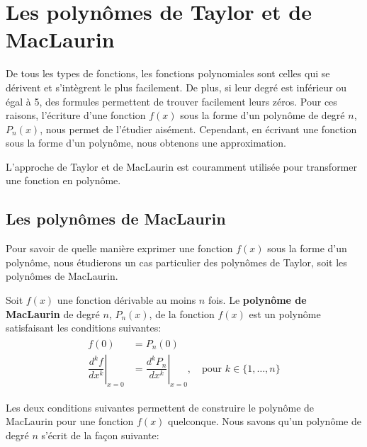 \documentclass[]{book}
\theoremstyle{definition}
\theoremstyle{definition}
\theoremstyle{definition}
\theoremstyle{remark}
\let\BeginKnitrBlock\begin \let\EndKnitrBlock\end
\begin{document}
\hypertarget{les-polynomes-de-taylor-et-de-maclaurin}{%
\section{Les polynômes de Taylor et de
MacLaurin}\label{les-polynomes-de-taylor-et-de-maclaurin}}

De tous les types de fonctions, les fonctions polynomiales sont celles
qui se dérivent et s'intègrent le plus facilement. De plus, si leur
degré est inférieur ou égal à 5, des formules permettent de trouver
facilement leurs zéros. Pour ces raisons, l'écriture d'une fonction
\(f(x)\) sous la forme d'un polynôme de degré \(n\), \(P_n(x)\), nous
permet de l'étudier aisément. Cependant, en écrivant une fonction sous
la forme d'un polynôme, nous obtenons une approximation.

L'approche de Taylor et de MacLaurin est couramment utilisée pour
transformer une fonction en polynôme.

\hypertarget{les-polynomes-de-maclaurin}{%
\subsection{Les polynômes de
MacLaurin}\label{les-polynomes-de-maclaurin}}

Pour savoir de quelle manière exprimer une fonction \(f(x)\) sous la
forme d'un polynôme, nous étudierons un cas particulier des polynômes de
Taylor, soit les polynômes de MacLaurin.

\BeginKnitrBlock{definition}[Polynôme de Maclaurin]
\protect\hypertarget{def:unnamed-chunk-1}{}{\label{def:unnamed-chunk-1}
{} }Soit \(f(x)\) une fonction
dérivable au moins \(n\) fois. Le \textbf{polynôme de MacLaurin} de
degré \(n\), \(P_n(x)\), de la fonction \(f(x)\) est un polynôme
satisfaisant les conditions suivantes: \begin{align}
\begin{split}
f(0) &= P_n(0) \\
\left.\dfrac{d^k f}{dx^k}\right|_{x=0} &= \left.\dfrac{d^k P_n}{dx^k}\right|_{x=0}, \quad \text{pour } k\in\{1,\ldots,n\}
\end{split}
\end{align}
\EndKnitrBlock{definition}

Les deux conditions suivantes permettent de construire le polynôme de
MacLaurin pour une fonction \(f(x)\) quelconque. Nous savons qu'un
polynôme de degré \(n\) s'écrit de la façon suivante:
\end{document}
